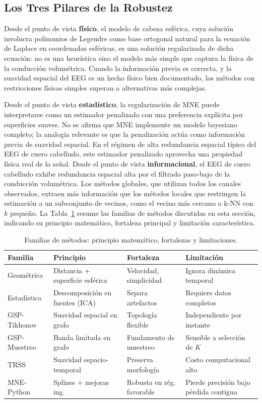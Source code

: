 \subsection{Los Tres Pilares de la Robustez}

Desde el punto de vista \textbf{físico}, el modelo de cabeza esférica, cuya solución involucra polinomios de Legendre como base ortogonal natural para la ecuación de Laplace en coordenadas esféricas, es una solución regularizada de dicha ecuación: no es una heurística sino el modelo más simple que captura la física de la conducción volumétrica. Cuando la información previa es correcta, y la suavidad espacial del EEG es un hecho físico bien documentado, los métodos con restricciones físicas simples superan a alternativas más complejas.

Desde el punto de vista \textbf{estadístico}, la regularización de MNE puede interpretarse como un estimador penalizado con una preferencia explícita por superficies suaves. No se afirma que MNE implemente un modelo bayesiano completo; la analogía relevante es que la penalización actúa como información previa de suavidad espacial. En el régimen de alta redundancia espacial típico del EEG de cuero cabelludo, este estimador penalizado aprovecha una propiedad física real de la señal.
Desde el punto de vista \textbf{informacional}, el EEG de cuero cabelludo exhibe redundancia espacial alta por el filtrado paso-bajo de la conducción volumétrica. Los métodos globales, que utilizan todos los canales observados, extraen más información que los métodos locales que restringen la estimación a un subconjunto de vecinos, como el vecino más cercano o k-NN con $k$ pequeño.
La Tabla~\ref{tab:method_families} resume las familias de métodos discutidas en esta sección, indicando su principio matemático, fortaleza principal y limitación característica.

\begin{table}[htbp]
\centering
\caption{Familias de métodos: principio matemático, fortalezas y limitaciones.}
\label{tab:method_families}
\small
\begin{tabular}{@{}p{2.2cm}p{3.0cm}p{3.1cm}p{3.2cm}@{}}
\toprule
Familia & Principio & Fortaleza & Limitación \\
\midrule
Geométrica & Distancia + superficie esférica & Velocidad, simplicidad & Ignora dinámica temporal \\
Estadística & Descomposición en fuentes (ICA) & Separa artefactos & Requiere datos completos \\
GSP-Tikhonov & Suavidad espacial en grafo & Topología flexible & Independiente por instante \\
GSP-Muestreo & Banda limitada en grafo & Fundamento de muestreo & Sensible a selección de $K$ \\
TRSS & Suavidad espacio-temporal & Preserva morfología & Costo computacional alto \\
MNE-Python & Splines + mejoras ing. & Robusta en rég. favorable & Pierde precisión bajo pérdida contigua \\
\bottomrule
\end{tabular}
\end{table}